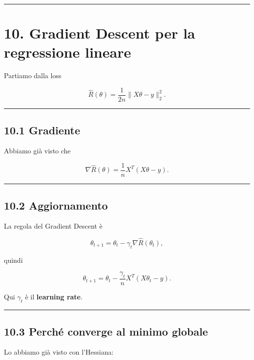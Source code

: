 \documentclass{article}
\begin{document}
\begin{center}\rule{0.5\linewidth}{0.5pt}\end{center}

\section{10. Gradient Descent per la regressione
lineare}\label{gradient-descent-per-la-regressione-lineare}

Partiamo dalla loss

\[
\hat R(\theta)=\frac{1}{2n}\|X\theta-y\|_2^2.
\]

\begin{center}\rule{0.5\linewidth}{0.5pt}\end{center}

\subsection{10.1 Gradiente}\label{gradiente-1}

Abbiamo già visto che

\[
\nabla \hat R(\theta)=\frac{1}{n}X^T(X\theta-y).
\]

\begin{center}\rule{0.5\linewidth}{0.5pt}\end{center}

\subsection{10.2 Aggiornamento}\label{aggiornamento}

La regola del Gradient Descent è

\[
\theta_{t+1}=\theta_t-\gamma_t \nabla \hat R(\theta_t),
\]

quindi

\[
\theta_{t+1}
=
\theta_t - \frac{\gamma_t}{n}X^T(X\theta_t-y).
\]

Qui \(\gamma_t\) è il \textbf{learning rate}.

\begin{center}\rule{0.5\linewidth}{0.5pt}\end{center}

\subsection{10.3 Perché converge al minimo
globale}\label{perchuxe9-converge-al-minimo-globale}

Lo abbiamo già visto con l'Hessiana:
\end{document}
